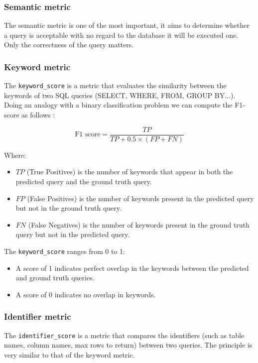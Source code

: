 \documentclass[12pt,a4paper]{article}
\begin{document}
\subsubsection*{Semantic metric}

The semantic metric is one of the most important, it aims to determine whether a query is acceptable with no regard to the database it will be executed one. Only the correctness of the query matters.

\subsubsection*{Keyword metric}

The \texttt{keyword\_score} is a metric that evaluates the similarity between the keywords of two SQL queries (SELECT, WHERE, FROM, GROUP BY...). Doing an analogy with a binary classification problem we can compute the F1-score as follows :

\[
\text{F1 score} = \frac{TP}{TP + 0.5 \times (FP + FN)}
\]

\noindent Where:

\begin{itemize}
  \item \( TP \) (True Positives) is the number of keywords that appear in both the predicted query and the ground truth query.
  \item \( FP \) (False Positives) is the number of keywords present in the predicted query but not in the ground truth query.
  \item \( FN \) (False Negatives) is the number of keywords present in the ground truth query but not in the predicted query.
\end{itemize}

\noindent The \texttt{keyword\_score} ranges from 0 to 1:
\begin{itemize}
  \item A score of 1 indicates perfect overlap in the keywords between the predicted and ground truth queries.
  \item A score of 0 indicates no overlap in keywords.
\end{itemize}

\subsubsection*{Identifier metric}

The \texttt{identifier\_score} is a metric that compares the identifiers (such as table names, column names, max rows to return) between two queries. The principle is very similar to that of the keyword metric.
\end{document}
